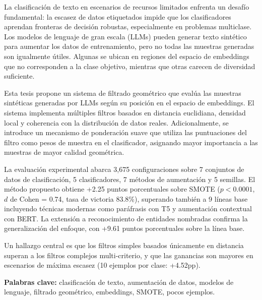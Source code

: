 \documentclass[
11pt, %
oneside, %
spanish, %
singlespacing, %
parskip, %
headsepline, %
table
]{MastersDoctoralThesis} %
\begin{document}
\begin{resumen}
\addchaptertocentry{\abstractname} %

La clasificación de texto en escenarios de recursos limitados enfrenta un desafío fundamental: la escasez de datos etiquetados impide que los clasificadores aprendan fronteras de decisión robustas, especialmente en problemas multiclase. Los modelos de lenguaje de gran escala (LLMs) pueden generar texto sintético para aumentar los datos de entrenamiento, pero no todas las muestras generadas son igualmente útiles. Algunas se ubican en regiones del espacio de embeddings que no corresponden a la clase objetivo, mientras que otras carecen de diversidad suficiente.

Esta tesis propone un sistema de filtrado geométrico que evalúa las muestras sintéticas generadas por LLMs según su posición en el espacio de embeddings. El sistema implementa múltiples filtros basados en distancia euclidiana, densidad local y coherencia con la distribución de datos reales. Adicionalmente, se introduce un mecanismo de ponderación suave que utiliza las puntuaciones del filtro como pesos de muestra en el clasificador, asignando mayor importancia a las muestras de mayor calidad geométrica.

La evaluación experimental abarca 3,675 configuraciones sobre 7 conjuntos de datos de clasificación, 5 clasificadores, 7 métodos de aumentación y 5 semillas. El método propuesto obtiene +2.25 puntos porcentuales sobre SMOTE ($p<0.0001$, $d$ de Cohen = 0.74, tasa de victoria 83.8\%), superando también a 9 líneas base incluyendo técnicas modernas como paráfrasis con T5 y aumentación contextual con BERT. La extensión a reconocimiento de entidades nombradas confirma la generalización del enfoque, con +9.61 puntos porcentuales sobre la línea base.

Un hallazgo central es que los filtros simples basados únicamente en distancia superan a los filtros complejos multi-criterio, y que las ganancias son mayores en escenarios de máxima escasez (10 ejemplos por clase: +4.52pp).

\textbf{Palabras clave:} clasificación de texto, aumentación de datos, modelos de lenguaje, filtrado geométrico, embeddings, SMOTE, pocos ejemplos.
\end{resumen}
\end{document}
